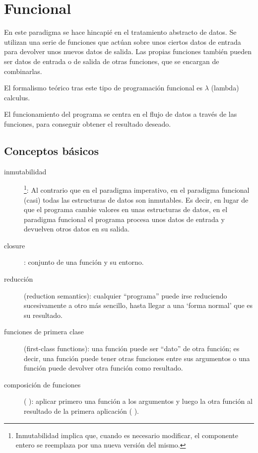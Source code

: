 \documentclass[spanish,12pt,a4paper,final,oneside]{book}
\begin{document}
\section{Funcional}
En este paradigma se hace hincapié en el tratamiento abstracto de datos. Se utilizan una serie de funciones que actúan sobre unos ciertos datos de entrada para devolver unos nuevos datos de salida. Las  propias funciones también pueden ser datos de entrada o de salida de otras funciones, que se encargan de combinarlas.

El formalismo teórico tras este tipo de programación funcional es $\lambda$ (lambda) calculus.

El funcionamiento del programa se centra en el flujo de datos a través de las funciones, para conseguir obtener el resultado deseado.

\subsection*{Conceptos básicos}
\begin{description}
\item[inmutabilidad]\footnote{Inmutabilidad implica que, cuando es necesario modificar, el componente entero se reemplaza por una nueva versión del mismo.}: Al contrario que en el paradigma imperativo, en el paradigma funcional (casi) todas las estructuras de datos son inmutables. Es decir, en lugar de que el programa cambie valores en unas estructuras de datos, en el paradigma funcional el programa procesa unos datos de entrada y devuelven otros datos en su salida.
\item[closure]: conjunto de una función y su entorno.
\item[reducción] (reduction semantics): cualquier ``programa'' puede irse reduciendo sucesivamente a otro más sencillo, hasta llegar a una `forma normal' que es su resultado. 
\item[funciones de primera clase] (first-class functions): una función puede ser ``dato'' de otra función; es decir, una función puede tener otras funciones entre sus argumentos o una función puede devolver otra función como resultado. 
\item[composición de funciones] ( ): aplicar primero una función a los argumentos y luego la otra función al resultado de la primera aplicación ( ).
\end{description}
\end{document}
